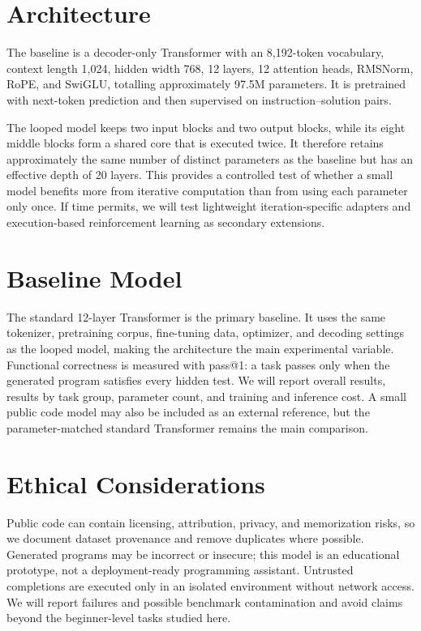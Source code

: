 \documentclass[final]{article}
\begin{document}
\section*{Architecture}
The baseline is a decoder-only Transformer with an 8,192-token vocabulary, context length 1,024, hidden width 768, 12 layers, 12 attention heads, RMSNorm, RoPE, and SwiGLU, totalling approximately 97.5M parameters. It is pretrained with next-token prediction and then supervised on instruction--solution pairs.

The looped model keeps two input blocks and two output blocks, while its eight middle blocks form a shared core that is executed twice. It therefore retains approximately the same number of distinct parameters as the baseline but has an effective depth of 20 layers. This provides a controlled test of whether a small model benefits more from iterative computation than from using each parameter only once. If time permits, we will test lightweight iteration-specific adapters and execution-based reinforcement learning as secondary extensions.

\section*{Baseline Model}
The standard 12-layer Transformer is the primary baseline. It uses the same tokenizer, pretraining corpus, fine-tuning data, optimizer, and decoding settings as the looped model, making the architecture the main experimental variable. Functional correctness is measured with pass@1: a task passes only when the generated program satisfies every hidden test. We will report overall results, results by task group, parameter count, and training and inference cost. A small public code model may also be included as an external reference, but the parameter-matched standard Transformer remains the main comparison.

\section*{Ethical Considerations}
Public code can contain licensing, attribution, privacy, and memorization risks, so we document dataset provenance and remove duplicates where possible. Generated programs may be incorrect or insecure; this model is an educational prototype, not a deployment-ready programming assistant. Untrusted completions are executed only in an isolated environment without network access. We will report failures and possible benchmark contamination and avoid claims beyond the beginner-level tasks studied here.

\newpage


\end{document}

